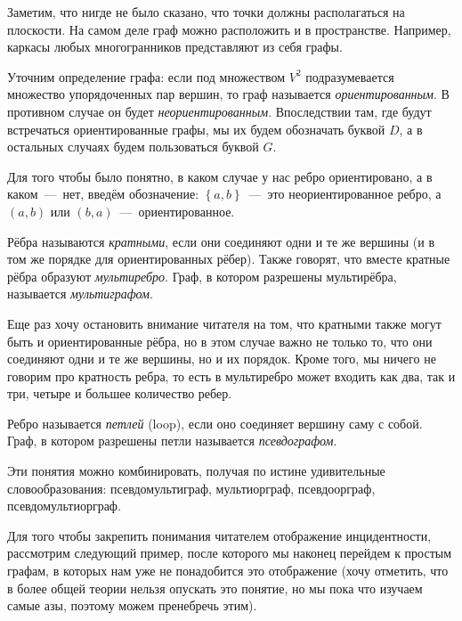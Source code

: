	Заметим, что нигде не было сказано, что точки должны располагаться на плоскости. На самом деле граф можно расположить и в пространстве. Например, каркасы любых многогранников представляют из себя графы.

	Уточним определение графа: если под множеством $V^2$ подразумевается множество упорядоченных пар вершин, то граф называется \emph{ориентированным}. В противном случае он будет \emph{неориентированным}. Впоследствии там, где будут встречаться ориентированные графы, мы их будем обозначать буквой $D$, а в остальных случаях будем пользоваться буквой $G$.

	Для того чтобы было понятно, в каком случае у нас ребро ориентировано, а в каком~---~нет, введём обозначение: $\left\lbrace a, b \right\rbrace$~---~это неориентированное ребро, а $(a, b)$ или $(b, a)$~---~ориентированное.
	
\begin{definition}
	Рёбра называются \emph{кратными}, если они соединяют одни и те же вершины (и в том же порядке для ориентированных рёбер). Также говорят, что вместе кратные рёбра образуют \emph{мультиребро}. Граф, в котором разрешены мультирёбра, называется \emph{мультиграфом}.
\end{definition}

	Еще раз хочу остановить внимание читателя на том, что кратными также могут быть и ориентированные рёбра, но в этом случае важно не только то, что они соединяют одни и те же вершины, но и их порядок. Кроме того, мы ничего не говорим про кратность ребра, то есть в мультиребро может входить как два, так и три, четыре и большее количество ребер.

\begin{definition}
	Ребро называется \emph{петлей} (loop), если оно соединяет вершину саму с собой. Граф, в котором разрешены петли называется \emph{псевдографом}.
\end{definition}

	Эти понятия можно комбинировать, получая по истине удивительные словообразования: псевдомультиграф, мультиорграф, псевдоорграф, псевдомультиорграф.

	Для того чтобы закрепить понимания читателем отображение инцидентности, рассмотрим следующий пример, после которого мы наконец перейдем к простым графам, в которых нам уже не понадобится это отображение (хочу отметить, что в более общей теории нельзя опускать это понятие, но мы пока что изучаем самые азы, поэтому можем пренебречь этим).

